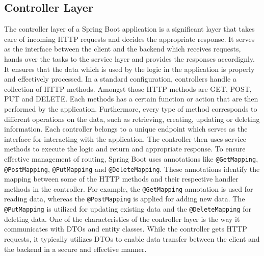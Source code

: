     \subsection{Controller Layer}
    The controller layer of a Spring Boot application is a significant layer that takes care of incoming HTTP requests and decides the appropriate response. It serves as the interface between the client and the backend which receives requests, hands over the tasks to the service layer and provides the responses accordignly. It ensures that the data which is used by the logic in the application is properly and effectively processed. \newline
    In a standard configuration, controllers handle a collection of HTTP methods. Amongst those HTTP methods are GET, POST, PUT and DELETE. Each methods has a certain function or action that are then performed by the application. Furthermore, every type of method corresponds to different operations on the data, such as retrieving, creating, updating or deleting information. Each controller belongs to a unique endpoint which serves as the interface for interacting with the application. The controller then uses service methods to execute the logic and return and appropriate response. \newline
    To ensure effective management of routing, Spring Boot uses annotations like \texttt{@GetMapping}, \texttt{@PostMapping}, \texttt{@PutMapping} and \texttt{@DeleteMapping}. These annotations identify the mapping between some of the HTTP methods and their respective handler methods in the controller. For example, the \texttt{@GetMapping} annotation is used for reading data, whereas the \texttt{@PostMapping} is applied for adding new data. The \texttt{@PutMapping} is utilized for updating existing data and the \texttt{@DeleteMapping} for deleting data. \newline
    One of the characteristics of the controller layer is the way it communicates with DTOs and entity classes. While the controller gets HTTP requests, it typically utilizes DTOs to enable data transfer between the client and the backend in a secure and effective manner.

